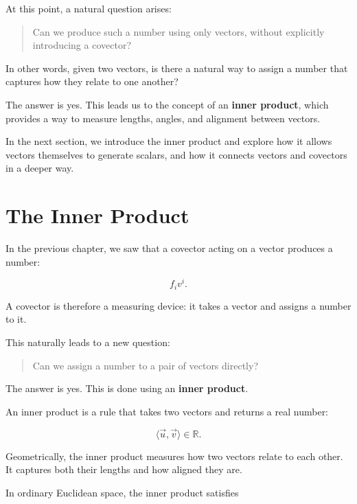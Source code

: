 \documentclass[11pt,openany]{book}
\theoremstyle{definition}
\begin{document}
\medskip

At this point, a natural question arises:

\begin{quote}
Can we produce such a number using only vectors, without explicitly introducing a covector?
\end{quote}

\medskip

In other words, given two vectors, is there a natural way to assign a number that
captures how they relate to one another?

\medskip

The answer is yes. This leads us to the concept of an \textbf{inner product}, which
provides a way to measure lengths, angles, and alignment between vectors.

\medskip

In the next section, we introduce the inner product and explore how it allows
vectors themselves to generate scalars, and how it connects vectors and covectors
in a deeper way.

\chapter{The Inner Product}

In the previous chapter, we saw that a covector acting on a vector produces a
number:

\[
f_i v^i.
\]

A covector is therefore a measuring device: it takes a vector and assigns a
number to it.

This naturally leads to a new question:

\begin{quote}
Can we assign a number to a pair of vectors directly?
\end{quote}

The answer is yes. This is done using an \textbf{inner product}.

\medskip

An inner product is a rule that takes two vectors and returns a real number:

\[
\langle \vec{u}, \vec{v} \rangle \in \mathbb{R}.
\]

Geometrically, the inner product measures how two vectors relate to each other.
It captures both their lengths and how aligned they are.

\medskip

In ordinary Euclidean space, the inner product satisfies
\end{document}

